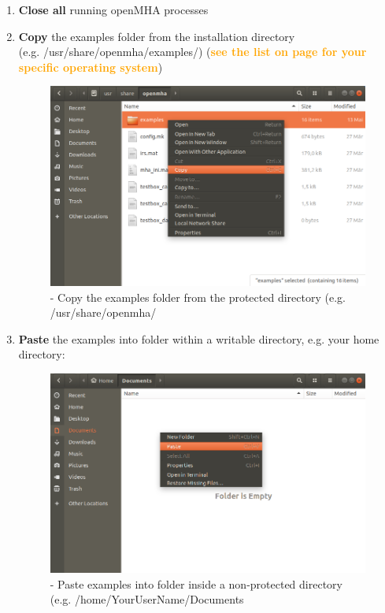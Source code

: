 \documentclass[11pt,a4paper,twoside]{article}
\newcommand{\+}{\discretionary{\mbox{\scriptsize$\hookleftarrow$}}{}{}}
\begin{document}
{{\begin{enumerate}
    \item \textbf{Close all} running openMHA processes
    
    \item \textbf{Copy} the examples folder from the installation directory
      \\
      (e.g. /usr/share/openmha/examples/)
      (\textcolor{orange}
        {\textbf{see the list on page \pageref{list:examples-location}
            for your specific operating system}})
   
\begin{figure}[H]
\centering
\includegraphics[scale=0.3]{copy_examples.png}
\caption{- Copy the examples folder from the protected directory (e.g. /usr/share/openmha/}
\end{figure}

\item \textbf{Paste} the examples into folder within a writable directory, e.g. your home directory:

\begin{figure}[H]
\centering
\includegraphics[scale=0.3]{paste_examples.png}
\caption{- Paste examples into folder inside a non-protected directory (e.g. /home/YourUserName/Documents}
\end{figure}
    

\end{enumerate}}}
\end{document}
